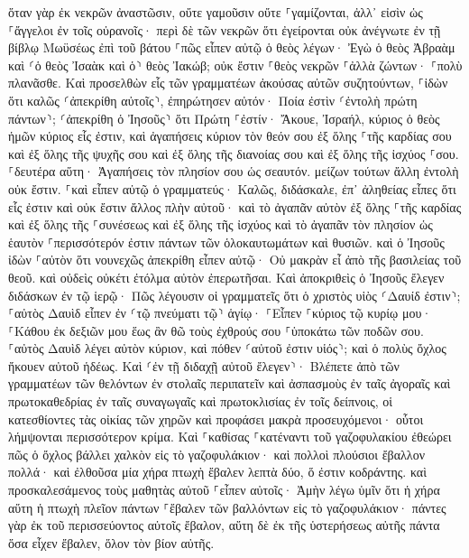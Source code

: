 \documentclass[twoside, 9pt]{extreport}
\begin{document}
ὅταν γὰρ ἐκ νεκρῶν ἀναστῶσιν, οὔτε γαμοῦσιν οὔτε ⸀γαμίζονται, ἀλλ᾽ εἰσὶν ὡς ⸀ἄγγελοι ἐν τοῖς οὐρανοῖς· 
περὶ δὲ τῶν νεκρῶν ὅτι ἐγείρονται οὐκ ἀνέγνωτε ἐν τῇ βίβλῳ Μωϋσέως ἐπὶ τοῦ βάτου ⸀πῶς εἶπεν αὐτῷ ὁ θεὸς λέγων· Ἐγὼ ὁ θεὸς Ἀβραὰμ καὶ ⸂ὁ θεὸς Ἰσαὰκ καὶ ὁ⸃ θεὸς Ἰακώβ; 
οὐκ ἔστιν ⸀θεὸς νεκρῶν ⸀ἀλλὰ ζώντων· ⸀πολὺ πλανᾶσθε. 
Καὶ προσελθὼν εἷς τῶν γραμματέων ἀκούσας αὐτῶν συζητούντων, ⸀ἰδὼν ὅτι καλῶς ⸂ἀπεκρίθη αὐτοῖς⸃, ἐπηρώτησεν αὐτόν· Ποία ἐστὶν ⸂ἐντολὴ πρώτη πάντων⸃; 
⸂ἀπεκρίθη ὁ Ἰησοῦς⸃ ὅτι Πρώτη ⸀ἐστίν· Ἄκουε, Ἰσραήλ, κύριος ὁ θεὸς ἡμῶν κύριος εἷς ἐστιν, 
καὶ ἀγαπήσεις κύριον τὸν θεόν σου ἐξ ὅλης ⸀τῆς καρδίας σου καὶ ἐξ ὅλης τῆς ψυχῆς σου καὶ ἐξ ὅλης τῆς διανοίας σου καὶ ἐξ ὅλης τῆς ἰσχύος ⸀σου. 
⸀δευτέρα αὕτη· Ἀγαπήσεις τὸν πλησίον σου ὡς σεαυτόν. μείζων τούτων ἄλλη ἐντολὴ οὐκ ἔστιν. 
⸀καὶ εἶπεν αὐτῷ ὁ γραμματεύς· Καλῶς, διδάσκαλε, ἐπ᾽ ἀληθείας εἶπες ὅτι εἷς ἐστιν καὶ οὐκ ἔστιν ἄλλος πλὴν αὐτοῦ· 
καὶ τὸ ἀγαπᾶν αὐτὸν ἐξ ὅλης ⸀τῆς καρδίας καὶ ἐξ ὅλης τῆς ⸀συνέσεως καὶ ἐξ ὅλης τῆς ἰσχύος καὶ τὸ ἀγαπᾶν τὸν πλησίον ὡς ἑαυτὸν ⸀περισσότερόν ἐστιν πάντων τῶν ὁλοκαυτωμάτων καὶ θυσιῶν. 
καὶ ὁ Ἰησοῦς ἰδὼν ⸀αὐτὸν ὅτι νουνεχῶς ἀπεκρίθη εἶπεν αὐτῷ· Οὐ μακρὰν εἶ ἀπὸ τῆς βασιλείας τοῦ θεοῦ. καὶ οὐδεὶς οὐκέτι ἐτόλμα αὐτὸν ἐπερωτῆσαι. 
Καὶ ἀποκριθεὶς ὁ Ἰησοῦς ἔλεγεν διδάσκων ἐν τῷ ἱερῷ· Πῶς λέγουσιν οἱ γραμματεῖς ὅτι ὁ χριστὸς υἱὸς ⸂Δαυίδ ἐστιν⸃; 
⸀αὐτὸς Δαυὶδ εἶπεν ἐν ⸂τῷ πνεύματι τῷ⸃ ἁγίῳ· ⸀Εἶπεν ⸀κύριος τῷ κυρίῳ μου· ⸀Κάθου ἐκ δεξιῶν μου ἕως ἂν θῶ τοὺς ἐχθρούς σου ⸀ὑποκάτω τῶν ποδῶν σου. 
⸀αὐτὸς Δαυὶδ λέγει αὐτὸν κύριον, καὶ πόθεν ⸂αὐτοῦ ἐστιν υἱός⸃; καὶ ὁ πολὺς ὄχλος ἤκουεν αὐτοῦ ἡδέως. 
Καὶ ⸂ἐν τῇ διδαχῇ αὐτοῦ ἔλεγεν⸃· Βλέπετε ἀπὸ τῶν γραμματέων τῶν θελόντων ἐν στολαῖς περιπατεῖν καὶ ἀσπασμοὺς ἐν ταῖς ἀγοραῖς 
καὶ πρωτοκαθεδρίας ἐν ταῖς συναγωγαῖς καὶ πρωτοκλισίας ἐν τοῖς δείπνοις, 
οἱ κατεσθίοντες τὰς οἰκίας τῶν χηρῶν καὶ προφάσει μακρὰ προσευχόμενοι· οὗτοι λήμψονται περισσότερον κρίμα. 
Καὶ ⸀καθίσας ⸀κατέναντι τοῦ γαζοφυλακίου ἐθεώρει πῶς ὁ ὄχλος βάλλει χαλκὸν εἰς τὸ γαζοφυλάκιον· καὶ πολλοὶ πλούσιοι ἔβαλλον πολλά· 
καὶ ἐλθοῦσα μία χήρα πτωχὴ ἔβαλεν λεπτὰ δύο, ὅ ἐστιν κοδράντης. 
καὶ προσκαλεσάμενος τοὺς μαθητὰς αὐτοῦ ⸀εἶπεν αὐτοῖς· Ἀμὴν λέγω ὑμῖν ὅτι ἡ χήρα αὕτη ἡ πτωχὴ πλεῖον πάντων ⸀ἔβαλεν τῶν βαλλόντων εἰς τὸ γαζοφυλάκιον· 
πάντες γὰρ ἐκ τοῦ περισσεύοντος αὐτοῖς ἔβαλον, αὕτη δὲ ἐκ τῆς ὑστερήσεως αὐτῆς πάντα ὅσα εἶχεν ἔβαλεν, ὅλον τὸν βίον αὐτῆς. 
\end{document}
